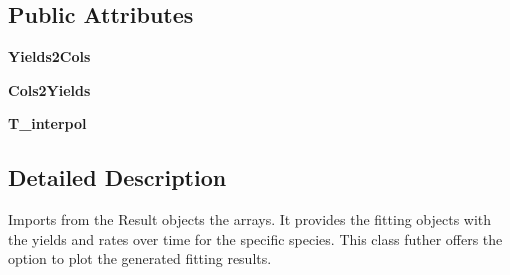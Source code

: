\subsection*{\-Public \-Attributes}
\begin{DoxyCompactItemize}
\item 
\hypertarget{classFitInfo_1_1Fit__one__run_ac2523fc7cbfc1346537cab9df6a44011}{{\bfseries \-Yields2\-Cols}}\label{classFitInfo_1_1Fit__one__run_ac2523fc7cbfc1346537cab9df6a44011}

\item 
\hypertarget{classFitInfo_1_1Fit__one__run_a035f7a0a99f02cfebd77b713ddda9810}{{\bfseries \-Cols2\-Yields}}\label{classFitInfo_1_1Fit__one__run_a035f7a0a99f02cfebd77b713ddda9810}

\item 
\hypertarget{classFitInfo_1_1Fit__one__run_a37a621b40a56c780a6f9f15d1df324ad}{{\bfseries \-T\-\_\-interpol}}\label{classFitInfo_1_1Fit__one__run_a37a621b40a56c780a6f9f15d1df324ad}

\end{DoxyCompactItemize}


\subsection{\-Detailed \-Description}
\begin{DoxyVerb}Imports from the Result objects the arrays. It provides the fitting objects with the yields and rates over time for the specific species. This class futher offers the option to plot the generated fitting results.\end{DoxyVerb}
 

